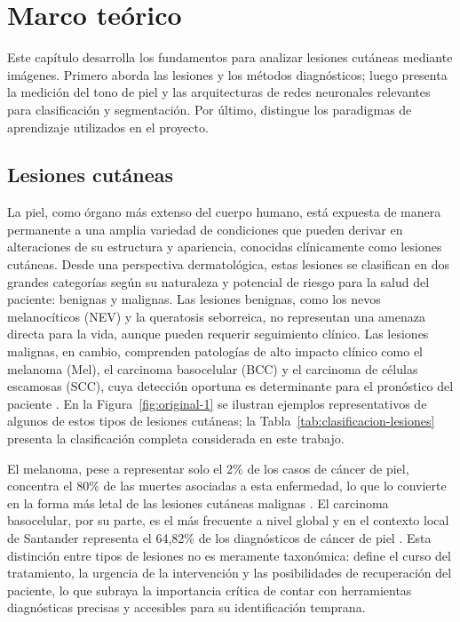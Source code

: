 \chapter{Marco teórico}

Este capítulo desarrolla los fundamentos para analizar lesiones cutáneas mediante imágenes. Primero aborda las lesiones y los métodos diagnósticos; luego presenta la medición del tono de piel y las arquitecturas de redes neuronales relevantes para clasificación y segmentación. Por último, distingue los paradigmas de aprendizaje utilizados en el proyecto.

\section{Lesiones cutáneas}

La piel, como órgano más extenso del cuerpo humano, está expuesta de manera permanente a una amplia variedad de condiciones que pueden derivar en alteraciones de su estructura y apariencia, conocidas clínicamente como lesiones cutáneas. Desde una perspectiva dermatológica, estas lesiones se clasifican en dos grandes categorías según su naturaleza y potencial de riesgo para la salud del paciente: benignas y malignas. Las lesiones benignas, como los nevos melanocíticos (NEV) y la queratosis seborreica, no representan una amenaza directa para la vida, aunque pueden requerir seguimiento clínico. Las lesiones malignas, en cambio, comprenden patologías de alto impacto clínico como el melanoma (Mel), el carcinoma basocelular (BCC) y el carcinoma de células escamosas (SCC), cuya detección oportuna es determinante para el pronóstico del paciente \parencite{urban2021globalburden}. En la Figura~\ref{fig:original-1} se ilustran ejemplos representativos de algunos de estos tipos de lesiones cutáneas; la Tabla~\ref{tab:clasificacion-lesiones} presenta la clasificación completa considerada en este trabajo.

El melanoma, pese a representar solo el 2\% de los casos de cáncer de piel, concentra el 80\% de las muertes asociadas a esta enfermedad, lo que lo convierte en la forma más letal de las lesiones cutáneas malignas \parencite{urban2021globalburden}. El carcinoma basocelular, por su parte, es el más frecuente a nivel global y en el contexto local de Santander representa el 64,82\% de los diagnósticos de cáncer de piel \parencite{uribe2018bccbucaramanga}. Esta distinción entre tipos de lesiones no es meramente taxonómica: define el curso del tratamiento, la urgencia de la intervención y las posibilidades de recuperación del paciente, lo que subraya la importancia crítica de contar con herramientas diagnósticas precisas y accesibles para su identificación temprana.

